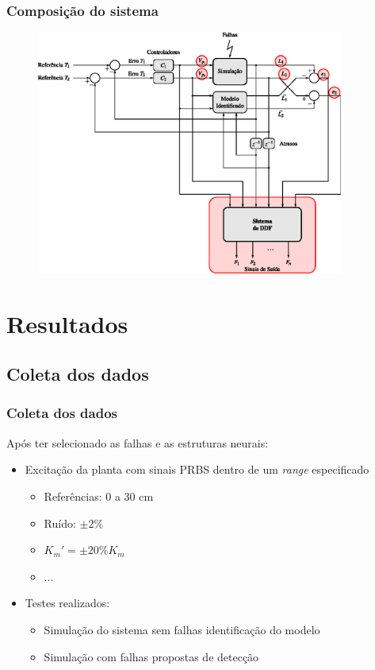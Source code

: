 \documentclass{beamer}
\begin{document}
\begin{frame}
    \frametitle{Composição do sistema}

\begin{figure}[htb]
\centering
    \includegraphics[width=0.9\textwidth]{imgs/sistema/eps/composicao_mod_8}
\end{figure}
\end{frame}

\section{Resultados}
\subsection{Coleta dos dados}

\begin{frame}
    \frametitle{Coleta dos dados}

    Após ter selecionado as falhas e as estruturas neurais:

\begin{itemize}
    \item Excitação da planta com sinais PRBS dentro de um {\it range}
          especificado
    \begin{itemize}
        \item Referências: 0 a 30 cm
        \item Ruído: $\pm 2\%$
        \item $K_m' = \pm 20\% K_m$
        \item ...
    \end{itemize}
    \item Testes realizados:
    \begin{itemize}
        \item Simulação do sistema sem falhas \implica identificação do modelo
        \item Simulação com falhas \implica propostas de detecção
    \end{itemize}
\end{itemize}
\end{frame}
\end{document}
